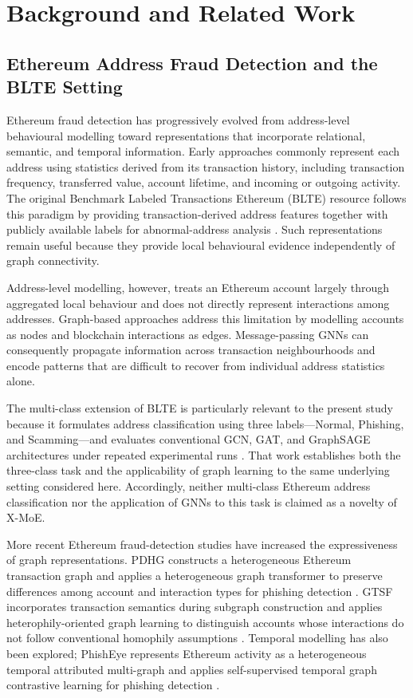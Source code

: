 \documentclass{ieeeaccess}
\begin{document}
\section{Background and Related Work}

\subsection{Ethereum Address Fraud Detection and the BLTE Setting}

Ethereum fraud detection has progressively evolved from address-level behavioural modelling toward representations that incorporate relational, semantic, and temporal information. Early approaches commonly represent each address using statistics derived from its transaction history, including transaction frequency, transferred value, account lifetime, and incoming or outgoing activity. The original Benchmark Labeled Transactions Ethereum (BLTE) resource follows this paradigm by providing transaction-derived address features together with publicly available labels for abnormal-address analysis \cite{alemari2021blte}. Such representations remain useful because they provide local behavioural evidence independently of graph connectivity.

Address-level modelling, however, treats an Ethereum account largely through aggregated local behaviour and does not directly represent interactions among addresses. Graph-based approaches address this limitation by modelling accounts as nodes and blockchain interactions as edges. Message-passing GNNs can consequently propagate information across transaction neighbourhoods and encode patterns that are difficult to recover from individual address statistics alone.

The multi-class extension of BLTE is particularly relevant to the present study because it formulates address classification using three labels---Normal, Phishing, and Scamming---and evaluates conventional GCN, GAT, and GraphSAGE architectures under repeated experimental runs \cite{alemari2026multiclass}. That work establishes both the three-class task and the applicability of graph learning to the same underlying setting considered here. Accordingly, neither multi-class Ethereum address classification nor the application of GNNs to this task is claimed as a novelty of X-MoE.

More recent Ethereum fraud-detection studies have increased the expressiveness of graph representations. PDHG constructs a heterogeneous Ethereum transaction graph and applies a heterogeneous graph transformer to preserve differences among account and interaction types for phishing detection \cite{wang2026pdhg}. GTSF incorporates transaction semantics during subgraph construction and applies heterophily-oriented graph learning to distinguish accounts whose interactions do not follow conventional homophily assumptions \cite{song2026gtsf}. Temporal modelling has also been explored; PhishEye represents Ethereum activity as a heterogeneous temporal attributed multi-graph and applies self-supervised temporal graph contrastive learning for phishing detection \cite{wu2026phisheye}.
\end{document}
